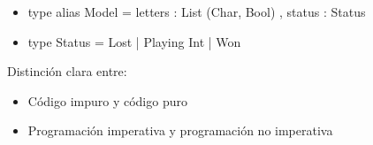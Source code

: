 \documentclass[spanish]{beamer}
\begin{document}

\begin{frame}[fragile]
  \begin{itemize}
  \item
    \begin{code}
type alias Model =
  { letters : List (Char, Bool)
  , status : Status
  }
    \end{code}
  \item
    \begin{code}
type Status
  = Lost
  | Playing Int
  | Won
    \end{code}
  \end{itemize}
\end{frame}


\begin{frame}[fragile]
  \begin{figure}
  \end{figure}
\end{frame}


\begin{frame}[fragile]
  Distinción clara entre:
  \begin{itemize}
  \item
    Código impuro y código puro
  \item
    Programación imperativa y programación no imperativa
  \end{itemize}
\end{frame}

\end{document}
